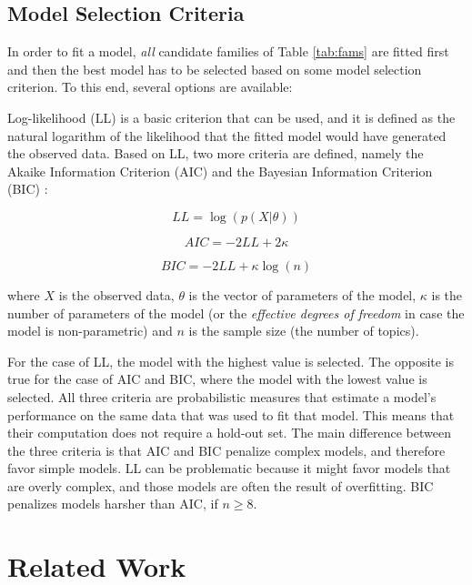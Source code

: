\subsection{Model Selection Criteria}\label{criteria}

In order to fit a model, \textit{all} candidate families of Table \ref{tab:fams} are fitted first and then the best model has to be selected based on some model selection criterion. To this end, several options are available:

Log-likelihood (LL) is a basic criterion that can be used, and it is defined as the natural logarithm of the likelihood that the fitted model would have generated the observed data. Based on LL, two more criteria are defined, namely the Akaike Information Criterion (AIC) \cite{Akaike1974} and the Bayesian Information Criterion (BIC) \cite{Schwarz1978}:

\begin{equation}\label{eq:LL}
	LL = \log\left(p\left(X|\theta\right)\right)
\end{equation}

\begin{equation}\label{eq:AIC}
	AIC = -2LL + 2\kappa 
\end{equation}

\begin{equation}\label{eq:BIC}
	BIC = -2LL + \kappa\log\left(n\right)
\end{equation}

where $X$ is the observed data, $\theta$ is the vector of parameters of the model, $\kappa$ is the number of parameters of the model (or the \textit{effective degrees of freedom} in case the model is non-parametric) and $n$ is the sample size (the number of topics).

For the case of LL, the model with the highest value is selected. The opposite is true for the case of AIC and BIC, where the model with the lowest value is selected. All three criteria are probabilistic measures that estimate a model's performance on the same data that was used to fit that model. This means that their computation does not require a hold-out set. The main difference between the three criteria is that AIC and BIC penalize complex models, and therefore favor simple models. LL can be problematic because it might favor models that are overly complex, and those models are often the result of overfitting. BIC penalizes models harsher than AIC, if $n \geq 8$. 

\section{Related Work}

